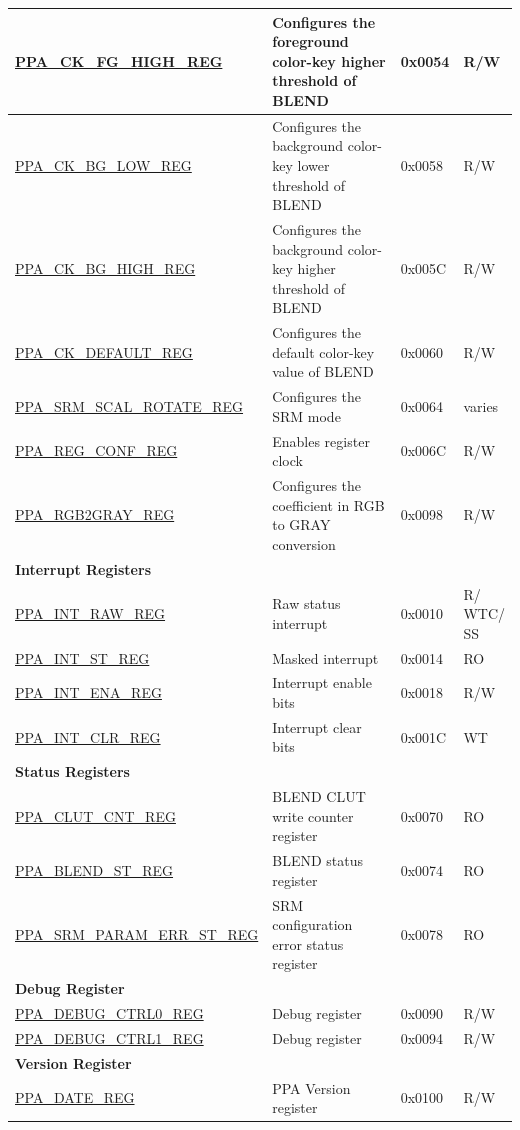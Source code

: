 \begin{longtable}{ | p{6cm} | p{7.2cm} | p{1.3cm} | p{1cm} | }
\hyperref[regdesc:PPACKFGHIGHREG]{PPA\_CK\_FG\_HIGH\_REG} & Configures the foreground color-key higher threshold of BLEND & 0x0054 & R/W \\ \hline
\hyperref[regdesc:PPACKBGLOWREG]{PPA\_CK\_BG\_LOW\_REG} & Configures the background color-key lower threshold of BLEND & 0x0058 & R/W \\ \hline
\hyperref[regdesc:PPACKBGHIGHREG]{PPA\_CK\_BG\_HIGH\_REG} & Configures the background color-key higher threshold of BLEND & 0x005C & R/W \\ \hline
\hyperref[regdesc:PPACKDEFAULTREG]{PPA\_CK\_DEFAULT\_REG} & Configures the default color-key value of BLEND & 0x0060 & R/W \\ \hline
\hyperref[regdesc:PPASRMSCALROTATEREG]{PPA\_SRM\_SCAL\_ROTATE\_REG} & Configures the SRM mode & 0x0064 & varies \\ \hline
\hyperref[regdesc:PPAREGCONFREG]{PPA\_REG\_CONF\_REG} & Enables register clock & 0x006C & R/W \\ \hline
\hyperref[regdesc:PPARGB2GRAYREG]{PPA\_RGB2GRAY\_REG} & Configures the coefficient in RGB to GRAY conversion & 0x0098 & R/W \\ \hline

\multicolumn{4}{|l|}{\textbf{Interrupt Registers}} \\ \hline
\hyperref[regdesc:PPAINTRAWREG]{PPA\_INT\_RAW\_REG} & Raw status interrupt & 0x0010 & \makecell[l]{R/\\WTC/\\SS} \\ \hline
\hyperref[regdesc:PPAINTSTREG]{PPA\_INT\_ST\_REG} & Masked interrupt & 0x0014 & RO \\ \hline
\hyperref[regdesc:PPAINTENAREG]{PPA\_INT\_ENA\_REG} & Interrupt enable bits & 0x0018 & R/W \\ \hline
\hyperref[regdesc:PPAINTCLRREG]{PPA\_INT\_CLR\_REG} & Interrupt clear bits & 0x001C & WT \\ \hline
\multicolumn{4}{|l|}{\textbf{Status Registers}} \\ \hline
\hyperref[regdesc:PPACLUTCNTREG]{PPA\_CLUT\_CNT\_REG} & BLEND CLUT write counter register & 0x0070 & RO \\ \hline
\hyperref[regdesc:PPABLENDSTREG]{PPA\_BLEND\_ST\_REG} & BLEND status register & 0x0074 & RO \\ \hline
\hyperref[regdesc:PPASRMPARAMERRSTREG]{PPA\_SRM\_PARAM\_ERR\_ST\_REG} & SRM configuration error status register & 0x0078 & RO \\ \hline

\multicolumn{4}{|l|}{\textbf{Debug Register}} \\ \hline
\hyperref[regdesc:PPADEBUGCTRL0REG]{PPA\_DEBUG\_CTRL0\_REG} & Debug register & 0x0090 & R/W \\ \hline
\hyperref[regdesc:PPADEBUGCTRL1REG]{PPA\_DEBUG\_CTRL1\_REG} & Debug register & 0x0094 & R/W \\ \hline
\multicolumn{4}{|l|}{\textbf{Version Register}} \\ \hline
\hyperref[regdesc:PPADATEREG]{PPA\_DATE\_REG} & PPA Version register & 0x0100 & R/W \\ \hline
\end{longtable}
